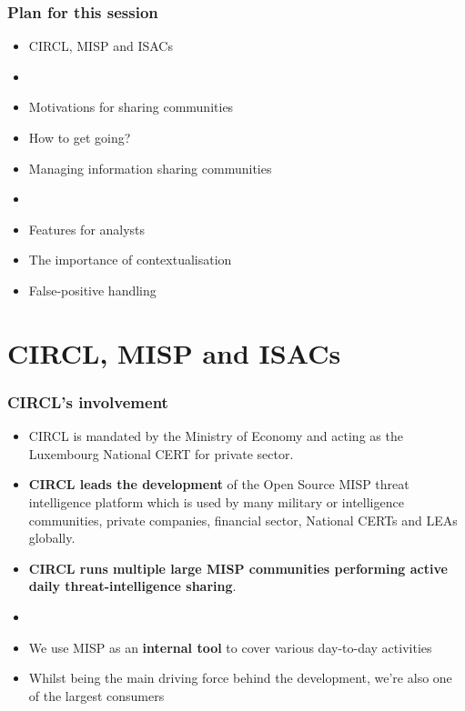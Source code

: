 
\begin{frame}[t,plain]
\titlepage
\end{frame}

\begin{frame}
	\frametitle{Plan for this session}
	\begin{itemize}
		\item CIRCL, MISP and ISACs
		\item []
		\item Motivations for sharing communities
		\item How to get going?
		\item Managing information sharing communities
		\item []
		\item Features for analysts
		\item The importance of contextualisation
		\item False-positive handling
	\end{itemize}
\end{frame}

\section{CIRCL, MISP and ISACs}

\begin{frame}
	\frametitle{CIRCL's involvement}
	\begin{itemize}
		\item CIRCL is mandated by the Ministry of Economy and acting as the Luxembourg National CERT for private sector.
		\item {\bf CIRCL leads the development} of the Open Source MISP threat intelligence platform which is used by many military or intelligence communities, private companies, financial sector, National CERTs and LEAs globally.
		\item {\bf CIRCL runs multiple large MISP communities performing active daily threat-intelligence sharing}.
        \item []
        \item We use MISP as an {\bf internal tool} to cover various day-to-day activities
        \item Whilst being the main driving force behind the development, we're also one of the largest consumers
	\end{itemize}
\end{frame}

